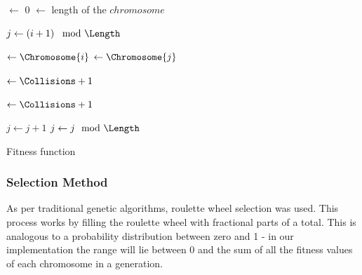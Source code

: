 \documentclass{sig-alternate}
\begin{document}
\begin{algorithm}\label{fitness_algorithm}
  \SetAlgoLined
  \DontPrintSemicolon
  
  {
    \BlankLine
    
    \Collisions $\leftarrow$ 0\;
    \Length $\leftarrow$ length of the $chromosome$\;
    \BlankLine
    
    {
      $j \leftarrow \left( i + 1 \right) \mod{\Length}$\;
      {
        \Yi $\leftarrow \Chromosome{i}$\;
        \Yj $\leftarrow \Chromosome{j}$\;
        \BlankLine
        
        \If{\Yi == \Yj}
        {
          \Collisions $\leftarrow \Collisions + 1$\; 
        }
        \BlankLine
        
        {
          \Collisions $\leftarrow \Collisions + 1$\;
        }
        \BlankLine
        
        $j \leftarrow j + 1$\;
        $j \leftarrow j \mod{\Length}$\;
      }
    }
    \BlankLine

    {
      \;
    }
    {
      \;
    }
  }
\caption{Fitness function}
\label{alg:fitness}
\end{algorithm}

\subsubsection{Selection Method}
As per traditional genetic algorithms, roulette wheel selection was used. This process works by filling the roulette wheel with fractional parts of a total. This is analogous to a probability distribution between zero and 1 - in our implementation the range will lie between 0 and the sum of all the fitness values of each chromosome in a generation.
\end{document}
